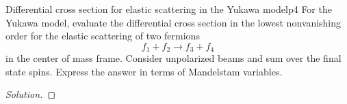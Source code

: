 \begin{problem}{Differential cross section for elastic scattering in the Yukawa model}{p4}
    For the Yukawa model, evaluate the differential cross section in the lowest nonvanishing order for the elastic scattering of two fermions
    \begin{equation*}
        f_1 + f_2 \to f_3 + f_4
    \end{equation*}
    in the center of mass frame. Consider unpolarized beams and sum over the final state spins. Express the answer in terms of Mandelstam variables.
\end{problem}
\begin{proof}[Solution]
    
\end{proof}
